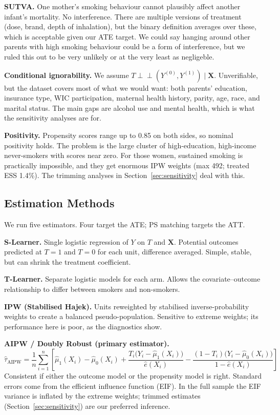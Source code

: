 \documentclass[11pt]{article}
\begin{document}
\textbf{SUTVA.}
One mother's smoking behaviour cannot plausibly affect another infant's
mortality. No interference. There are multiple versions of treatment
(dose, brand, depth of inhalation), but the binary definition averages over
these, which is acceptable given our ATE target. We could say hanging around
other parents with high smoking behaviour could be a form of interference, 
but we ruled this out to be very unlikely or at the very least as negligeble.

\textbf{Conditional ignorability.}
We assume $T \perp\!\!\!\perp (Y^{(0)}, Y^{(1)}) \mid \mathbf{X}$.
Unverifiable, but the dataset covers most of what we would want: both parents'
education, insurance type, WIC participation, maternal health history, parity,
age, race, and marital status. The main gaps are alcohol use and mental health,
which is what the sensitivity analyses are for.

\textbf{Positivity.}
Propensity scores range up to 0.85 on both sides, so nominal positivity holds.
The problem is the large cluster of high-education, high-income never-smokers
with scores near zero. For those women, sustained smoking is practically
impossible, and they get enormous IPW weights (max 492; treated ESS 1.4\%).
The trimming analyses in Section~\ref{sec:sensitivity} deal with this.

\subsection{Estimation Methods}

We run five estimators. Four target the ATE; PS matching targets the ATT.

\textbf{S-Learner.} Single logistic regression of $Y$ on $T$ and $\mathbf{X}$.
Potential outcomes predicted at $T=1$ and $T=0$ for each unit, difference
averaged. Simple, stable, but can shrink the treatment coefficient.

\textbf{T-Learner.} Separate logistic models for each arm. Allows
the covariate--outcome relationship to differ between smokers and non-smokers.

\textbf{IPW (Stabilised Hajek).} Units reweighted by stabilised
inverse-probability weights to create a balanced pseudo-population. Sensitive to
extreme weights; its performance here is poor, as the diagnostics show.

\textbf{AIPW / Doubly Robust (primary estimator).}
\begin{equation}
\hat{\tau}_{\text{AIPW}} = \frac{1}{n}\sum_{i=1}^{n}
\left[\hat\mu_1(X_i) - \hat\mu_0(X_i)
+ \frac{T_i\bigl(Y_i - \hat\mu_1(X_i)\bigr)}{\hat{e}(X_i)}
- \frac{(1-T_i)\bigl(Y_i - \hat\mu_0(X_i)\bigr)}{1-\hat{e}(X_i)}\right]
\end{equation}
Consistent if either the outcome model or the propensity model is right.
Standard errors come from the efficient influence function (EIF). In the full
sample the EIF variance is inflated by the extreme weights; trimmed estimates
(Section~\ref{sec:sensitivity}) are our preferred inference.
\end{document}
